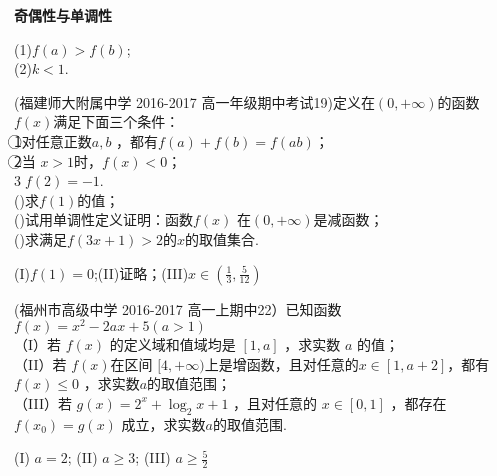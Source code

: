 \begin{exercise}{\bf 奇偶性与单调性}
\begin{answer}
(1)$f(a)>f(b)$;\\
(2)$k<1$.\\
\end{answer}
\vspace{15em}
\item
(福建师大附属中学 2016-2017 高一年级期中考试19)定义在$(0,+\infty)$的函数$f(x)$满足下面三个条件：\\ \textcircled{1}对任意正数$a,b$ ，都有$f(a)+f(b)=f(ab)$；\\
\textcircled{2}当 $x>1$时，$f(x)<0$；\\
\textcircled{3}$f(2)=-1$.\\
()求$f(1)$的值；\\
()试用单调性定义证明：函数$f(x)$ 在$(0,+\infty)$是减函数； \\
()求满足$f(3x+1)>2$的$x$的取值集合.
\begin{answer}
(I)$f(1)=0$;(II)证略；(III)$x\in(\frac13,\frac5{12})$
\end{answer}
\vspace{18em}
\item
(福州市高级中学 2016-2017 高一上期中22）已知函数$f(x)=x^2-2ax+5(a>1)$\\
（I）若 $f (x )$ 的定义域和值域均是 $[1, a]$ ，求实数 $a$ 的值； \\
（II）若 $f (x ) $在区间 $[4,+\infty)$上是增函数，且对任意的$ x \in[1, a+ 2]$，都有 $f( x )\leq 0$ ，求实数$a$的取值范围；\\
（III）若 $g( x )=2^x+\log_2{x+ 1 }$ ，且对任意的 $x \in[0,1]$ ，都存在$f(x_0)=g(x)$ 成立，求实数$a$的取值范围.\\
\begin{answer}
(I) $a=2$; (II) $a\geq3$; (III) $a\geq\frac52$
\end{answer}
\vspace{18em}
\end{exercise}

{\hspace{2em}}
{\hspace{2em}}
{\hspace{2em}}
{\hspace{2em}}
\stopexercise
